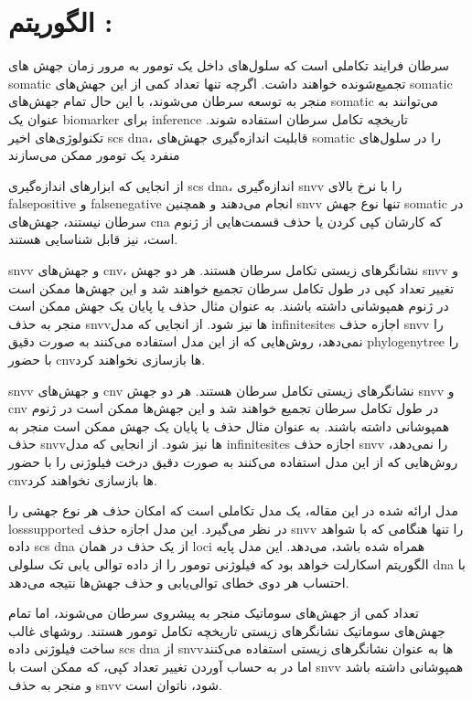 \section{الگوریتم :\cite{satas2020scarlet}}

سرطان فرایند تکاملی است که سلول‌های داخل یک تومور به مرور زمان جهش های \gls{somatic} تجمیع‌شونده خواهند داشت. اگرچه تنها تعداد کمی از این جهش‌های \gls{somatic} منجر به توسعه سرطان می‌شوند، با این حال تمام جهش‌های \gls{somatic} می‌توانند به عنوان یک \gls{biomarker} برای \gls{inference} تاریخچه تکامل سرطان استفاده شوند. تکنولوژی‌های اخیر \gls{scs} \gls{dna}، قابلیت اندازه‌گیری جهش‌های \gls{somatic} را در سلول‌های منفرد یک تومور ممکن می‌سازند

از انجایی که ابزارهای اندازه‌گیری \gls{scs} \gls{dna}، اندازه‌گیری \gls{snvv}  را با نرخ بالای \gls{falsepositive} و \gls{falsenegative} انجام می‌دهند و همچنین \gls{snvv} تنها نوع جهش \gls{somatic} در سرطان نیستند، جهش‌های \gls{cna}  که کارشان کپی کردن یا حذف قسمت‌هایی از ژنوم است، نیز قابل شناسایی هستند. 

\gls{snvv} و جهش‌های \gls{cnv}، نشانگرهای زیستی تکامل سرطان هستند. هر دو جهش \gls{snvv} و تغییر تعداد کپی در طول تکامل سرطان تجمیع خواهند شد و این جهش‌ها ممکن است در ژنوم همپوشانی داشته باشند. به عنوان مثال حذف یا پایان یک جهش ممکن است منجر به حذف \gls{snvv}‌ها نیز شود. از انجایی‌ که مدل \gls{infinitesites} اجازه حذف \gls{snvv} را نمی‌دهد، روش‌هایی که از این مدل استفاده می‌کنند به صورت دقیق \gls{phylogenytree} را با حضور \gls{cnv}ها بازسازی نخواهند کرد. 




\gls{snvv} و جهش‌های \gls{cnv} نشانگرهای زیستی تکامل سرطان هستند. هر دو جهش \gls{snvv} و \gls{cnv} در طول تکامل سرطان تجمیع خواهند شد و این جهش‌ها ممکن است در ژنوم همپوشانی داشته باشند. به عنوان مثال حذف یا پایان یک جهش ممکن است منجر به حذف \gls{snvv}ها نیز شود. از انجایی که مدل \gls{infinitesites} اجازه حذف \gls{snvv} را نمی‌د‌هد، روش‌هایی که از این مدل استفاده می‌کنند به صورت دقیق درخت فیلوژنی را با حضور \gls{cnv}‌ها بازسازی نخواهند کرد. 


مدل ارائه شده در این مقاله، یک مدل تکاملی است که امکان حذف هر نوع جهشی را  \gls{losssupported} در نظر می‌گیرد.  این مدل اجازه حذف \gls{snvv} را تنها هنگامی که با شواهد داده \gls{scs} \gls{dna} از یک حذف در همان \gls{loci} همراه شده باشد، می‌دهد. این مدل پایه الگوریتم اسکارلت خواهد بود که فیلوژنی تومور را از داده توالی یابی تک سلولی \gls{dna} با احتساب هر دوی خطای توالی‌یابی و حذف جهش‌ها نتیجه می‌دهد. 

تعداد کمی از جهش‌های سوماتیک منجر به پیشروی سرطان می‌شوند، اما تمام جهش‌های سوماتیک نشانگرهای زیستی تاریخچه تکامل تومور هستند. روشهای غالب ساخت فیلوژنی داده \gls{scs} \gls{dna} از \gls{snvv}ها به عنوان نشانگرهای زیستی استفاده می‌کنند اما در به حساب آوردن تغییر تعداد کپی، که ممکن است با \gls{snvv} همپوشانی داشته باشد و منجر به حذف \gls{snvv} شود، ناتوان است. 


